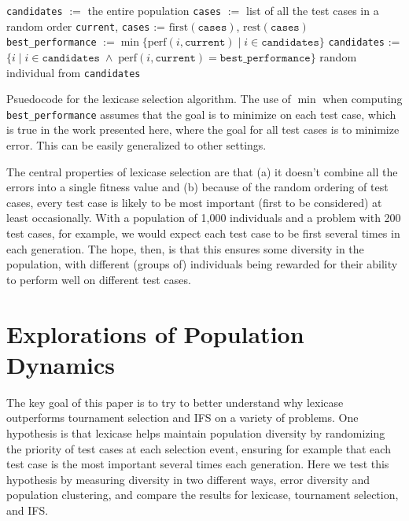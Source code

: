 \begin{algorithm}[tb]
	\begin{algorithmic}
		\STATE \texttt{candidates} $:=$ the entire population
		\STATE \texttt{cases} $:=$ list of all the test cases in a random order
			\STATE \texttt{current}, \texttt{cases} := $\textrm{first}(\texttt{cases})$, $\textrm{rest}(\texttt{cases})$
			\STATE \texttt{best\_performance} $:= \min \{ \textrm{perf}(i, \texttt{current}) \;|\; i \in \texttt{candidates} \}$
			\STATE \texttt{candidates} := $\{ i \;|\; i \in \texttt{candidates} \;\land\; \textrm{perf}(i, \texttt{current}) = \texttt{best\_performance}\}$
		\ENDWHILE
		\RETURN random individual from \texttt{candidates}
	\end{algorithmic}
	\caption{Psuedocode for the lexicase selection algorithm. The use of $\min$ when computing 
		\texttt{best\_performance} assumes that the goal is to minimize on each test case, which
		is true in the work presented here, where the goal for all test cases is to minimize error.
		This can be easily generalized to other settings.}
	\label{alg:lexicase}
\end{algorithm}

The central properties of lexicase selection are that (a) it doesn't combine all the errors into a single
fitness value and (b) because of the random ordering of test cases, every test case is likely to be
most important (first to be considered) at least occasionally. With a population of 1,000 individuals
and a problem with 200 test cases, for example, we would expect each test case to be first several
times in each generation. The hope, then, is that this ensures some diversity in the population, with
different (groups of) individuals being rewarded for their ability to perform well on different test
cases.


\section{Explorations of Population Dynamics}


The key goal of this paper is to try to better understand why lexicase outperforms tournament selection
and IFS on a variety of problems. One hypothesis is that lexicase helps maintain population diversity
by randomizing the priority of test cases at each selection event, ensuring for example that each test 
case is the most important several times each generation. Here we test this hypothesis by measuring 
diversity in two different ways, error diversity and population clustering, and compare the results 
for lexicase, tournament selection, and IFS.


